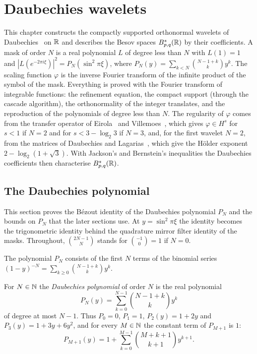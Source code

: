 \chapter{Daubechies wavelets}
\label{ch:daubechies}

This chapter constructs the compactly supported orthonormal wavelets of
Daubechies~\cite{Daubechies} on $\mathbb{R}$ and describes the Besov spaces $B^{s}_{p,q}(\mathbb{R})$ by
their coefficients. A mask of order $N$ is a real polynomial $L$ of degree less than $N$ with
$L(1) = 1$ and $|L(e^{-2\pi i \xi})|^2 = P_N(\sin^2 \pi\xi)$, where
$P_N(y) = \sum_{k < N} \binom{N-1+k}{k} y^k$. The scaling function $\varphi$ is the inverse
Fourier transform of the infinite product of the symbol of the mask. Everything is proved with
the Fourier transform of integrable functions: the refinement equation, the compact support
(through the cascade algorithm), the orthonormality of the integer translates, and the
reproduction of the polynomials of degree less than $N$. The regularity of $\varphi$ comes from
the transfer operator of Eirola~\cite{Eirola} and Villemoes~\cite{Villemoes}, which gives
$\varphi \in H^s$ for $s < 1$ if $N = 2$ and for $s < 3 - \log_2 3$ if $N = 3$, and, for the
first wavelet $N = 2$, from the matrices of Daubechies and Lagarias~\cite{DaubechiesLagarias},
which give the H\"older exponent $2 - \log_2(1 + \sqrt 3)$. With Jackson's and Bernstein's
inequalities the Daubechies coefficients then characterise $B^{s}_{p,q}(\mathbb{R})$.

\section{The Daubechies polynomial}

This section proves the B\'ezout identity of the Daubechies polynomial $P_N$ and the bounds on
$P_N$ that the later sections use. At $y = \sin^2 \pi\xi$ the identity becomes the trigonometric
identity behind the quadrature mirror filter identity of the masks. Throughout,
$\binom{2N-1}{N}$ stands for $\binom{-1}{0} = 1$ if $N = 0$.

The polynomial $P_N$ consists of the first $N$ terms of the binomial series
$(1 - y)^{-N} = \sum_{k \geq 0} \binom{N-1+k}{k} y^k$.

\begin{definition}
\label{def:daub-poly}
\leanok
For $N \in \mathbb{N}$ the \emph{Daubechies polynomial} of order $N$ is the real polynomial
\[
  P_N(y) = \sum_{k=0}^{N-1} \binom{N-1+k}{k} y^k
\]
of degree at most $N - 1$. Thus $P_0 = 0$, $P_1 = 1$, $P_2(y) = 1 + 2y$ and
$P_3(y) = 1 + 3y + 6y^2$, and for every $M \in \mathbb{N}$ the constant term of $P_{M+1}$ is $1$:
\[
  P_{M+1}(y) = 1 + \sum_{k=0}^{M-1} \binom{M+k+1}{k+1} y^{k+1} .
\]
\end{definition}

